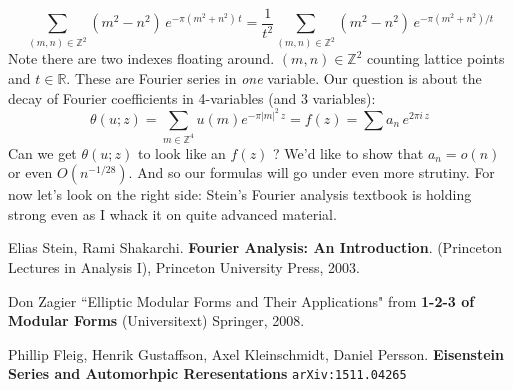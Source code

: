 \documentclass[12pt]{article}
\begin{document}
$$ 
\sum_{(m,n) \in \mathbb{Z}^2} (m^2 - n^2 )\, e^{- \pi ( m^2 + n^2 ) \, t} =  \frac{1}{t^2} 
\sum_{(m,n) \in \mathbb{Z}^2} (m^2 - n^2 )\, e^{- \pi ( m^2 + n^2 ) /t} $$
Note there are two indexes floating around.  $(m,n) \in \mathbb{Z}^2$ counting lattice points and $t \in \mathbb{R}$.  These are Fourier series in \textit{one} variable.  Our question is about the decay of Fourier coefficients in 4-variables (and 3 variables):
$$ \theta(u;z) = \sum_{m \in \mathbb{Z}^4} u(m) e^{- \pi  |m|^2 \,z} = f(z) = \sum a_n \, e^{2\pi i \, z } $$
Can we get $\theta(u;z)$ to look like an $f(z)$ ? We'd like to show that $a_n = o(n)$ or even $O(n^{-1/28})$.  And so our formulas will go under even more strutiny.  For now let's look on the right side: Stein's Fourier analysis textbook is holding strong even as I whack it on quite advanced material. 
\vfill

\begin{thebibliography}{}

\item Elias Stein, Rami Shakarchi.  \textbf{Fourier Analysis: An Introduction}. (Princeton Lectures in Analysis I), Princeton University Press, 2003.

\item Don Zagier ``Elliptic Modular Forms and Their Applications" from \textbf{1-2-3 of Modular Forms} (Universitext) Springer, 2008.

\item Phillip Fleig, Henrik Gustaffson, Axel Kleinschmidt, Daniel Persson.  \textbf{Eisenstein Series and Automorhpic Reresentations} \texttt{arXiv:1511.04265}

\end{thebibliography}
\end{document}
